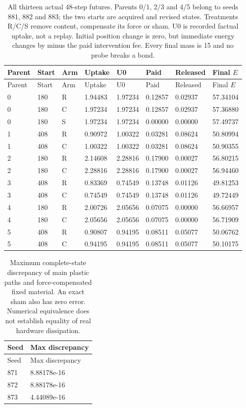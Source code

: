 \begin{longtable}{llllllll}
\caption{All thirteen actual 48-step futures. Parents 0/1, 2/3 and 4/5 belong to seeds 881, 882 and 883; the two starts are acquired and revised states. Treatments R/C/S remove content, compensate its force or sham. U0 is recorded factual uptake, not a replay. Initial position change is zero, but immediate energy changes by minus the paid intervention fee. Every final mass is 15 and no probe breaks a bond.}\label{tab:contact-probes}\\
\toprule
Parent & Start & Arm & Uptake & U0 & Paid & Released & Final $E$\\
\midrule\endfirsthead
\toprule
Parent & Start & Arm & Uptake & U0 & Paid & Released & Final $E$\\
\midrule\endhead
0 & 180 & R & 1.94483 & 1.97234 & 0.12857 & 0.02937 & 57.34104\\
0 & 180 & C & 1.97234 & 1.97234 & 0.12857 & 0.02937 & 57.36880\\
0 & 180 & S & 1.97234 & 1.97234 & 0.00000 & 0.00000 & 57.49737\\
1 & 408 & R & 0.90972 & 1.00322 & 0.03281 & 0.08624 & 50.80994\\
1 & 408 & C & 1.00322 & 1.00322 & 0.03281 & 0.08624 & 50.90355\\
2 & 180 & R & 2.14608 & 2.28816 & 0.17900 & 0.00027 & 56.80215\\
2 & 180 & C & 2.28816 & 2.28816 & 0.17900 & 0.00027 & 56.94460\\
3 & 408 & R & 0.83369 & 0.74549 & 0.13748 & 0.01126 & 49.81253\\
3 & 408 & C & 0.74549 & 0.74549 & 0.13748 & 0.01126 & 49.72449\\
4 & 180 & R & 2.00726 & 2.05656 & 0.07075 & 0.00000 & 56.66957\\
4 & 180 & C & 2.05656 & 2.05656 & 0.07075 & 0.00000 & 56.71909\\
5 & 408 & R & 0.90807 & 0.94195 & 0.08511 & 0.05077 & 50.06762\\
5 & 408 & C & 0.94195 & 0.94195 & 0.08511 & 0.05077 & 50.10175\\
\bottomrule
\end{longtable}
\begin{longtable}{ll}
\caption{Maximum complete-state discrepancy of main plastic paths and force-compensated fixed material. An exact sham also has zero error. Numerical equivalence does not establish equality of real hardware dissipation.}\label{tab:contact-null}\\
\toprule
Seed & Max discrepancy\\
\midrule\endfirsthead
\toprule
Seed & Max discrepancy\\
\midrule\endhead
871 & 8.88178e-16\\
872 & 8.88178e-16\\
873 & 4.44089e-16\\
\bottomrule
\end{longtable}
